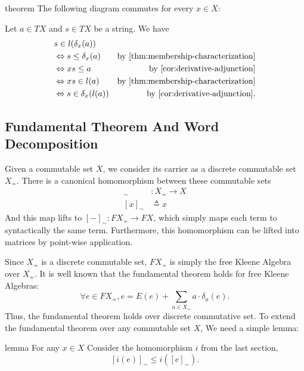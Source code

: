\documentclass[a4paper,UKenglish,cleveref, autoref, thm-restate]{lipics-v2021}
\begin{document}
\begin{theoremEnd}{theorem}
  \label{thm:derivative-commutes}
  The following diagram commutes for every $x  \in  X$:
  \begin{center}
  \end{center}
\end{theoremEnd}

\begin{proofEnd}
  Let $a  \in  TX$ and $s  \in  TX$ be a string.  We have
  \begin{align*}
    & s  \in  l( \delta _x(a)) \\
    &  \Leftrightarrow  s  \leq   \delta _x(a) & \text{by \Cref{thm:membership-characterization}} \\
    &  \Leftrightarrow  xs  \leq  a & \text{by \Cref{cor:derivative-adjunction}} \\
    &  \Leftrightarrow  xs  \in  l(a) & \text{by \Cref{thm:membership-characterization}} \\
    &  \Leftrightarrow  s  \in   \delta _x(l(a)) & \text{by \Cref{cor:derivative-adjunction}.}
  \end{align*}
\end{proofEnd}


\subsection{Fundamental Theorem And Word Decomposition}

Given a commutable set \(X\),
we consider its carrier as a discrete commutable set \(X_ \nsim \).
There is a canonical homomorphism between these commutable sets
\begin{align}
  [-]_ \sim  &: X_ \nsim   \to  X \\
  [x]_ \sim  &  \triangleq  x
\end{align}
And this map lifts to \([-]_ \sim : F X_ \nsim   \to  F X\),
which simply maps each term to syntactically the same term.
Furthermore, this homomorphism can be lifted into matrices by point-wise application.

Since \(X_ \nsim \) is a discrete commutable set,
\(F X_ \nsim \) is simply the free Kleene Algebra over \(X_ \nsim \).
It is well known that the fundamental theorem holds for free Kleene Algebras:
\[  \forall  e  \in  F X_ \nsim , e = E(e) +  \sum _{a  \in  X_ \nsim } a  \cdot   \delta _{a}(e).\]
Thus, the fundamental theorem holds over discrete commutative set.
To extend the fundamental theorem over any commutable set \(X\),
We need a simple lemma:
\begin{theoremEnd}{lemma}
  For any \(x  \in  X\)
  Consider the homomorphism \(i\) from the last section,
  \[[i(e)]_ \sim   \leq  i([e]_ \sim ).\]
\end{theoremEnd}
\end{document}
